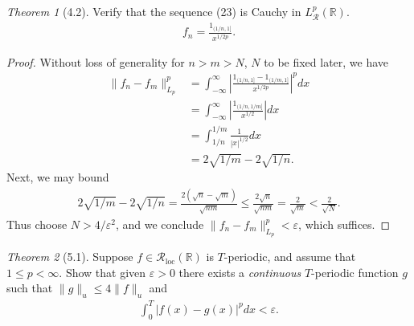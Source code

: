 \documentclass[12pt]{article}
\theoremstyle{remark}
\theoremstyle{named}
\newtheorem*{theorem}{Theorem}
\newcommand{\e}{\varepsilon}
\newcommand{\R}{\mathbb R}
\newcommand{\abs}[1]{|#1|}
\newcommand{\bigabs}[1]{\left|#1\right|}
\begin{document}
\begin{theorem}[4.2]
    Verify that the sequence (23) is Cauchy in \(L^p_{\mathcal R}(\R)\).
    \begin{align*}
        f_n = \frac{1_{(1/n, 1]}}{x^{1/2p}}.
    \end{align*}
\end{theorem}

\begin{proof}
    Without loss of generality for \(n > m > N\), \(N\) to be fixed later, we have
    \begin{align*}
        \|f_n - f_m\|_{L_p}^p &= \int_{-\infty}^{\infty} \bigabs{\frac{1_{(1/n, 1]} - 1_{(1/m, 1]}}{x^{1/2p}}}^p dx \\
        &= \int_{-\infty}^{\infty} \bigabs{\frac{1_{(1/n, 1/m]}}{x^{1/2}}} dx \\
        &= \int_{1/n}^{1/m} \frac{1}{|x|^{1/2}} dx \\
        &= 2 \sqrt{1/m} - 2 \sqrt{1/n}.
    \end{align*}
    Next, we may bound
    \begin{align*}
        2 \sqrt{1/m} - 2 \sqrt{1/n} = \frac{2(\sqrt n - \sqrt m)}{\sqrt{nm}} \leq \frac{2\sqrt n}{\sqrt{nm}} = \frac{2}{\sqrt m} < \frac{2}{\sqrt N}.
    \end{align*}
    Thus choose \(N > 4 / \e^2\), and we conclude \(\|f_n - f_m\|_{L_p}^p < \e\), which suffices.
\end{proof}

\begin{theorem}[5.1]
    Suppose \(f \in \mathcal{R}_{\text{loc}}(\R)\) is \(T\)-periodic, and assume that \(1 \leq p < \infty\). Show that given \(\e > 0\) there exists a \textit{continuous} \(T\)-periodic function \(g\) such that \(\|g\|_u \leq 4 \|f\|_u\) and 
    \begin{align*}
        \int_{0}^{T} \abs{f(x) - g(x)}^p dx < \e.
    \end{align*}
\end{theorem}
\end{document}
